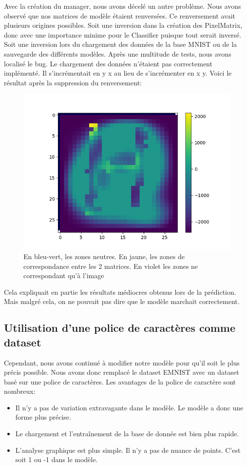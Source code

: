 \documentclass[a4paper, 12pt]{article}
\begin{document}
Avec la création du manager, nous avons décelé un autre problème. Nous avons observé que nos matrices de modèle étaient renversées. Ce renversement avait plusieurs origines possibles. Soit une inversion dans la création des PixelMatrix, donc avec une importance minime pour le Classifier puisque tout serait inversé. Soit une inversion lors du chargement des données de la base MNIST ou de la sauvegarde des différents modèles. Après une multitude de tests, nous avons localisé le bug. Le chargement des données n’étaient pas correctement implémenté. Il s'incrémentait en y x au lieu de s’incrémenter en x y.
Voici le résultat après la suppression du renversement:
\begin{figure}[!ht]
\centering
\includegraphics[scale=0.55]{img/pix_corb0.png}
\caption{En bleu-vert, les zones neutres. En jaune, les zones de correspondance entre les 2 matrices. En violet les zones ne correspondant qu'à l'image}
\end{figure}

Cela expliquait en partie les résultats médiocres obtenus lors de la prédiction. Mais malgré cela, on ne pouvait pas dire que le modèle marchait correctement.

\subsection{Utilisation d'une police de caractères comme dataset}
Cependant, nous avons continué à modifier notre modèle pour qu'il soit le plus précis possible. Nous avons donc remplacé le dataset EMNIST avec un dataset basé sur une police de caractères. Les avantages de la police de caractère sont nombreux:
\begin{itemize}
\item Il n'y a pas de variation extravagante dans le modèle. Le modèle a donc une forme plus précise.
\item Le chargement et l'entraînement de la base de donnée est bien plus rapide.
\item L'analyse graphique est plus simple. Il n'y a pas de nuance de points. C'est soit 1 ou -1 dans le modèle.
\end{itemize}
\end{document}

